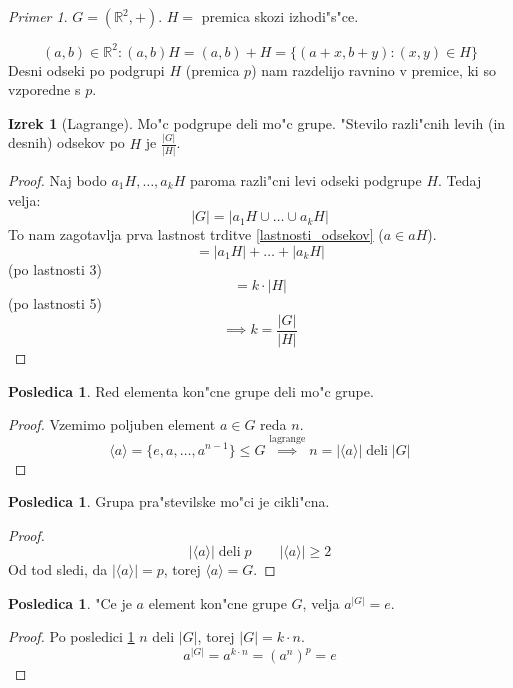\documentclass[11pt, a4paper]{article}
\theoremstyle{definition}
\newtheorem{conseq}[counter]{Posledica}
\newtheorem{theorem}[counter]{Izrek}
\theoremstyle{remark}
\newtheorem*{ex}{Primer}
\newcommand{\R}{\mathbb{R}}
\begin{document}
	\begin{ex}
		$G = (\R^2, +)$. $H = $ premica skozi izhodi"s"ce.
		
		\[ (a,b) \in \R^2: (a,b)H = (a,b)+H = \lbrace (a+x, b+y): (x,y) \in H \rbrace \]
		Desni odseki po podgrupi $H$ (premica $p$) nam razdelijo ravnino v premice, ki so vzporedne s $p$.
	\end{ex}

	\begin{theorem}[Lagrange]
		Mo"c podgrupe deli mo"c grupe. "Stevilo razli"cnih levih (in desnih) odsekov po $H$ je $\frac{|G|}{|H|}$.
	\end{theorem}
	\begin{proof}
		Naj bodo $a_1H, \ldots, a_kH$ paroma razli"cni levi odseki podgrupe $H$. Tedaj velja:
		\[ |G| = |a_1H \cup \ldots \cup a_kH| \]
		To nam zagotavlja prva lastnost trditve \ref{lastnosti_odsekov} ($a \in aH$).
		\[ = |a_1H| + \ldots + |a_kH| \]
		(po lastnosti 3)
		\[ = k \cdot |H| \]
		(po lastnosti 5)
		\[ \implies k = \frac{|G|}{|H|} \]
	\end{proof}

	\begin{conseq}\label{red_deli_moc}
		Red elementa kon"cne grupe deli mo"c grupe.
	\end{conseq}
	\begin{proof}
		Vzemimo poljuben element $a \in G$ reda $n$.
		\[ \langle a \rangle = \lbrace e, a, \ldots, a^{n-1} \rbrace \leq G \overset{\text{lagrange}}{\implies} n = |\langle a \rangle| \operatorname{deli} |G| \]
	\end{proof}

	\begin{conseq}
		Grupa pra"stevilske mo"ci je cikli"cna.
	\end{conseq}
	\begin{proof}
		\[ |\langle a \rangle| \operatorname{deli} p \qquad |\langle a \rangle| \geq 2 \]
		Od tod sledi, da $|\langle a \rangle| = p$, torej $\langle a \rangle = G$.
	\end{proof}

	\begin{conseq}\label{a_na_moc}
		"Ce je $a$ element kon"cne grupe $G$, velja $a^{|G|} = e$.
	\end{conseq}
	\begin{proof}
		Po posledici \ref{red_deli_moc} $n$ deli $|G|$, torej $|G| = k \cdot n$.
		\[ a^{|G|} = a^{k \cdot n} = (a^n)^p = e \]
	\end{proof}
\end{document}
